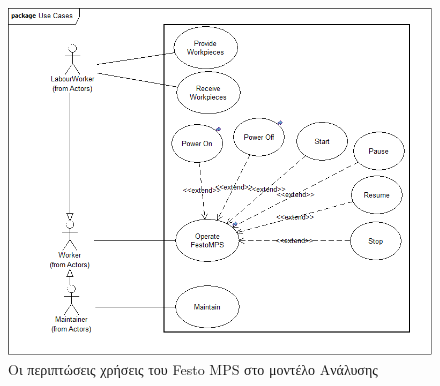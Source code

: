 \documentclass[a4paper,12pt,twoside]{report}
\begin{document}
{\begin{appendices}
			\clearpage
			\begin{figure}[hp]
					\centering
					\includegraphics[scale=0.30]{AnalysisModel_uc-TopLevelUseCases.png}
					\caption{Οι περιπτώσεις χρήσεις του Festo MPS στο μοντέλο Ανάλυσης}
					\label{φωτ:Οι περιπτώσεις χρήσεις του Festo MPS στο μοντέλο Ανάλυσης}
			\end{figure}
			

\end{appendices}}
\end{document}
